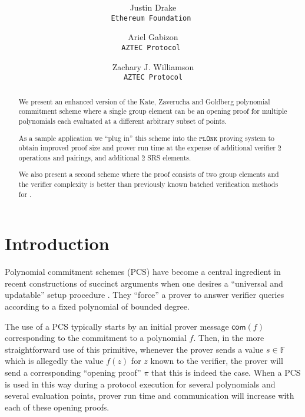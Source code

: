 \documentclass[11pt]{article} %
\title{ \bf \papertitle \\[0.72cm]}
\author{Justin Drake \\ \tt{Ethereum Foundation} \and  Ariel Gabizon\\ \tt{AZTEC Protocol}  \and Zachary J. Williamson\\ \tt{AZTEC Protocol}}
\newcommand{\F}{\ensuremath{\mathbb F}\xspace}
\newcommand{\com}{\ensuremath{\mathsf{com}}\xspace}
\newcommand{\plonk}{\ensuremath{\mathtt{PLONK}}\xspace}
\begin{document}
    \maketitle

\begin{abstract}
We present an enhanced version of the Kate, Zaverucha and Goldberg polynomial commitment scheme \cite{kate} where a single group element can be an opening proof for multiple polynomials each evaluated at a different arbitrary subset of points.



As a sample application we ``plug in'' this scheme into the \plonk proving system\cite{plonk} to obtain improved proof size and prover run time at the expense of additional verifier \G2 operations and pairings,  and additional \G2 SRS elements.

We also present a second scheme where the proof consists of two group elements and the verifier complexity is better than previously known batched verification methods for \cite{kate}.
\end{abstract}

\section{Introduction}

Polynomial commitment schemes (PCS)\cite{kate} have become a central ingredient in recent constructions of succinct arguments \cite{sonic,auroralight, marlin,plonk,supersonic} when one desires a ``universal and updatable'' setup procedure \cite{firstUniversal}.
They ``force'' a prover to answer verifier queries according to a fixed polynomial of bounded degree.

The use of a PCS typically starts by an initial prover message $\com(f)$ corresponding to the commitment to a polynomial $f$. Then, in the more straightforward use of this primitive, whenever the prover sends a value $s\in \F$ which is allegedly the value $f(z)$ for $z$ known to the verifier, the prover will send a corresponding ``opening proof'' $\pi$ that this is indeed the case. When a PCS is used in this way during a protocol execution for several polynomials and several evaluation points, prover run time and communication will increase with each of these opening proofs.
\end{document}
